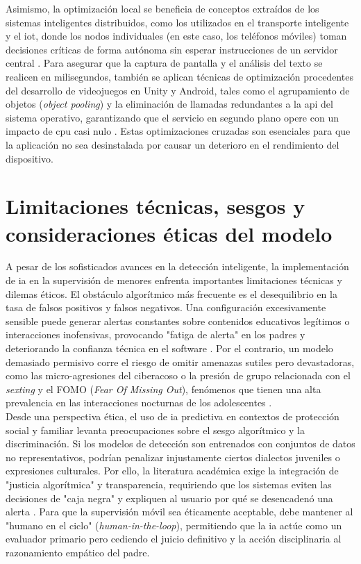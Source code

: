 Asimismo, la optimización local se beneficia de conceptos extraídos de los sistemas inteligentes distribuidos, como los utilizados en el transporte inteligente y el \gls{iot}, donde los nodos individuales (en este caso, los teléfonos móviles) toman decisiones críticas de forma autónoma sin esperar instrucciones de un servidor central \cite{oladimeji_smart_2023}. Para asegurar que la captura de pantalla y el análisis del texto se realicen en milisegundos, también se aplican técnicas de optimización procedentes del desarrollo de videojuegos en Unity y Android, tales como el agrupamiento de objetos (\textit{object pooling}) y la eliminación de llamadas redundantes a la \gls{api} del sistema operativo, garantizando que el servicio en segundo plano opere con un impacto de \gls{cpu} casi nulo \cite{koulaxidis_improving_2022}. Estas optimizaciones cruzadas son esenciales para que la aplicación no sea desinstalada por causar un deterioro en el rendimiento del dispositivo.\\

\section{Limitaciones técnicas, sesgos y consideraciones éticas del modelo}

A pesar de los sofisticados avances en la detección inteligente, la implementación de \gls{ia} en la supervisión de menores enfrenta importantes limitaciones técnicas y dilemas éticos. El obstáculo algorítmico más frecuente es el desequilibrio en la tasa de falsos positivos y falsos negativos. Una configuración excesivamente sensible puede generar alertas constantes sobre contenidos educativos legítimos o interacciones inofensivas, provocando "fatiga de alerta" en los padres y deteriorando la confianza técnica en el software \cite{rojas_technical_2025, banic_comparison_2024}. Por el contrario, un modelo demasiado permisivo corre el riesgo de omitir amenazas sutiles pero devastadoras, como las micro-agresiones del ciberacoso o la presión de grupo relacionada con el \textit{sexting} y el FOMO (\textit{Fear Of Missing Out}), fenómenos que tienen una alta prevalencia en las interacciones nocturnas de los adolescentes \cite{tomczyk_sexting_2023}.\\

Desde una perspectiva ética, el uso de \gls{ia} predictiva en contextos de protección social y familiar levanta preocupaciones sobre el sesgo algorítmico y la discriminación. Si los modelos de detección son entrenados con conjuntos de datos no representativos, podrían penalizar injustamente ciertos dialectos juveniles o expresiones culturales. Por ello, la literatura académica exige la integración de "justicia algorítmica" y transparencia, requiriendo que los sistemas eviten las decisiones de "caja negra" y expliquen al usuario por qué se desencadenó una alerta \cite{agbana_ethical_2025}. Para que la supervisión móvil sea éticamente aceptable, debe mantener al "humano en el ciclo" (\textit{human-in-the-loop}), permitiendo que la \gls{ia} actúe como un evaluador primario pero cediendo el juicio definitivo y la acción disciplinaria al razonamiento empático del padre.\\


